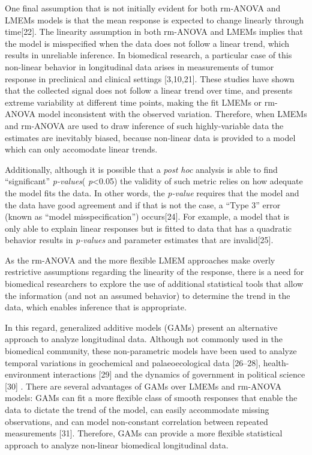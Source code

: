 \documentclass[
]{article}
\begin{document}
One final assumption that is not initially evident for both rm-ANOVA and LMEMs models is that the mean response is expected to change linearly through time{[}22{]}. The linearity assumption in both rm-ANOVA and LMEMs implies that the model is misspecified when the data does not follow a linear trend, which results in unreliable inference. In biomedical research, a particular case of this non-linear behavior in longitudinal data arises in measurements of tumor response in preclinical and clinical settings {[}3,10,21{]}. These studies have shown that the collected signal does not follow a linear trend over time, and presents extreme variability at different time points, making the fit LMEMs or rm-ANOVA model inconsistent with the observed variation. Therefore, when LMEMs and rm-ANOVA are used to draw inference of such highly-variable data the estimates are inevitably biased, because non-linear data is provided to a model which can only accomodate linear trends.

Additionally, although it is possible that a \emph{post hoc} analysis is able to find ``significant'' \emph{p-values}( \emph{p}\textless0.05) the validity of such metric relies on how adequate the model fits the data. In other words, the \emph{p-value} requires that the model and the data have good agreement and if that is not the case, a ``Type 3'' error (known as ``model misspecification'') occurs{[}24{]}. For example, a model that is only able to explain linear responses but is fitted to data that has a quadratic behavior results in \emph{p-values} and parameter estimates that are invalid{[}25{]}.

As the rm-ANOVA and the more flexible LMEM approaches make overly restrictive assumptions regarding the linearity of the response, there is a need for biomedical researchers to explore the use of additional statistical tools that allow the information (and not an assumed behavior) to determine the trend in the data, which enables inference that is appropriate.

In this regard, generalized additive models (GAMs) present an alternative approach to analyze longitudinal data. Although not commonly used in the biomedical community, these non-parametric models have been used to analyze temporal variations in geochemical and palaeoecological data {[}26--28{]}, health-environment interactions {[}29{]} and the dynamics of government in political science {[}30{]} . There are several advantages of GAMs over LMEMs and rm-ANOVA models: GAMs can fit a more flexible class of smooth responses that enable the data to dictate the trend of the model, can easily accommodate missing observations, and can model non-constant correlation between repeated measurements {[}31{]}. Therefore, GAMs can provide a more flexible statistical approach to analyze non-linear biomedical longitudinal data.
\end{document}
